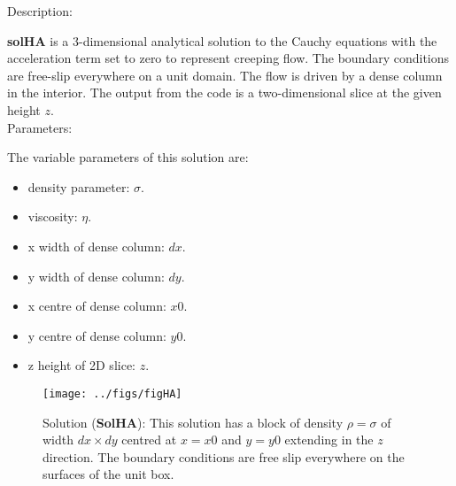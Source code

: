   {\large \fontB Description:}
  
  {\bf solHA} is a 3-dimensional analytical solution to the Cauchy equations with the acceleration term set to zero
  to represent creeping flow. The boundary conditions are free-slip everywhere on a unit domain. 
  The flow is driven by a dense column in the interior. The output from the code is a two-dimensional slice
  at the given height  $z$.
  \\

  {\large \fontB Parameters:}
 
  The variable parameters of this solution are:
  \begin{itemize}
    \item{density parameter: $ \sigma $.}
    \item{viscosity: $\eta$.}
    \item{x width of dense column: $dx$.}
    \item{y width of dense column: $dy$.}
    \item{x centre of dense column: $x0$.}
    \item{y centre of dense column: $y0$.}
    \item{z height of 2D slice: $z$.}
    \end{itemize}

  \begin{SCfigure}[][h]
    \texttt{[image: ../figs/figHA]}
    \caption[Short caption]{\label{figHA} 
      Solution ({\bf SolHA}):
      This solution has a block of density $\rho = \sigma$
      of width $dx \times dy$ centred at $x=x0$ and $y=y0$    
       extending in the $z$ direction.
      The boundary conditions are free slip everywhere on the surfaces of the unit box.}
  \end{SCfigure} 
  

